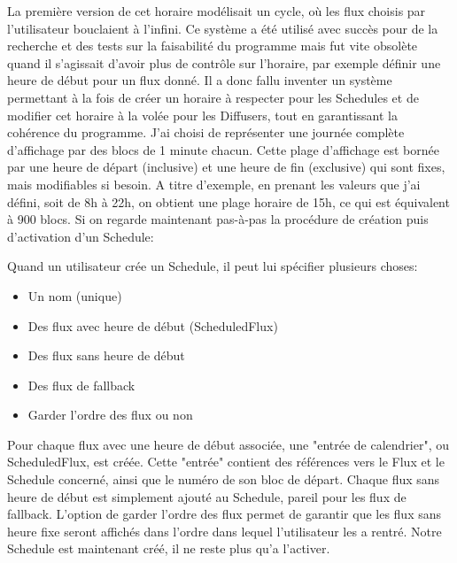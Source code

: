 \documentclass[french]{article}
\begin{document}
La première version de cet horaire modélisait un cycle, où les flux choisis par l'utilisateur bouclaient à l'infini. Ce système a été utilisé avec succès pour de la recherche et des tests sur la faisabilité du programme mais fut vite obsolète quand il s'agissait d'avoir plus de contrôle sur l'horaire, par exemple définir une heure de début pour un flux donné. \newline
Il a donc fallu inventer un système permettant à la fois de créer un horaire à respecter pour les Schedules et de modifier cet horaire à la volée pour les Diffusers, tout en garantissant la cohérence du programme. 
	\newline
J'ai choisi de représenter une journée complète d'affichage par des blocs de 1 minute chacun. Cette plage d'affichage est bornée par une heure de départ (inclusive) et une heure de fin (exclusive) qui sont fixes, mais modifiables si besoin. A titre d'exemple, en prenant les valeurs que j'ai défini, soit de 8h à 22h, on obtient une plage horaire de 15h, ce qui est équivalent à 900 blocs. 
Si on regarde maintenant pas-à-pas la procédure de création puis d'activation d'un Schedule:

Quand un utilisateur crée un Schedule, il peut lui spécifier plusieurs choses:
\begin{itemize}
	\item Un nom (unique)
	\item Des flux avec heure de début (ScheduledFlux)
	\item Des flux sans heure de début 
	\item Des flux de fallback
	\item Garder l'ordre des flux ou non
\end{itemize}

Pour chaque flux avec une heure de début associée, une "entrée de calendrier", ou ScheduledFlux, est créée. Cette "entrée" contient des références vers le Flux et le Schedule concerné, ainsi que le numéro de son bloc de départ.\newline
Chaque flux sans heure de début est simplement ajouté au Schedule, pareil pour les flux de fallback. L'option de garder l'ordre des flux permet de garantir que les flux sans heure fixe seront affichés dans l'ordre dans lequel l'utilisateur les a rentré. Notre Schedule est maintenant créé, il ne reste plus qu'a l'activer.\newline
\end{document}
